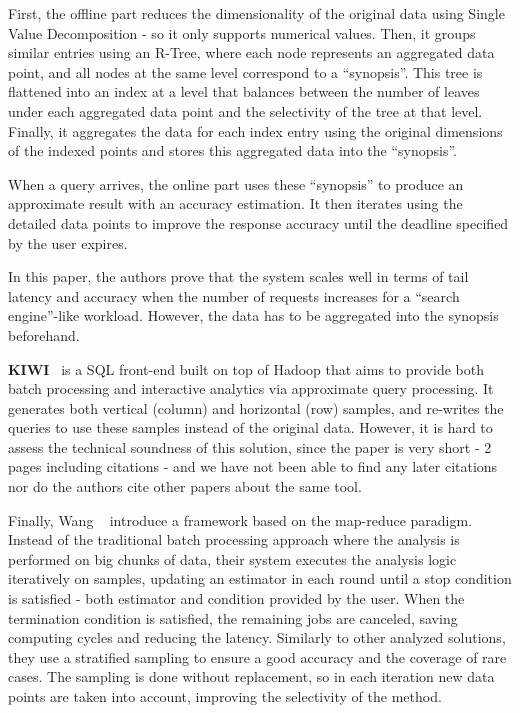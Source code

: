 First, the offline part reduces the dimensionality of the original data using 
Single Value Decomposition - so it only supports numerical values. 
Then, it groups similar entries using an R-Tree, where each node represents an 
aggregated data point, and all nodes at the same level correspond to a 
``synopsis''. This tree is flattened into an index at a level that balances 
between the number of leaves under each aggregated data point and the 
selectivity of the tree at that level. Finally, it aggregates the data for 
each index entry using the original dimensions of the indexed points and stores 
this aggregated data into the ``synopsis''.

When a query arrives, the online part uses these ``synopsis'' to produce 
an approximate result with an accuracy estimation. It then iterates 
using the detailed data points to improve the response accuracy until the
deadline specified by the user expires.

In this paper, the authors prove that the system scales well in terms 
of tail latency and accuracy when the number of requests increases for a 
``search engine''-like workload. However, the data has to be aggregated into 
the synopsis beforehand.

\medskip

\textbf{KIWI}~\cite{Kim2015} is a SQL front-end built on top of Hadoop that aims 
to provide both batch processing and interactive analytics via approximate
query processing. It generates both vertical (column) and horizontal (row) 
samples, and re-writes the queries to use these samples instead of the original 
data. However, it is hard to assess the technical soundness of this 
solution, since the paper is very short - 2 pages including citations -
and we have not been able to find any later citations nor do the authors cite 
other papers about the same tool.

\medskip

Finally, Wang \etal~\cite{WangYi2015} introduce a framework based on the 
map-reduce paradigm. Instead of the traditional batch processing approach 
where the analysis is performed on big chunks of data, their system executes the 
analysis logic iteratively on samples, updating an estimator in each round 
until a stop condition is satisfied - both estimator and condition provided by 
the user. When the termination condition is satisfied, the remaining jobs are 
canceled, saving computing cycles and reducing the latency. Similarly to other 
analyzed solutions, they use a stratified sampling to ensure a good accuracy and 
the coverage of rare cases. 
The sampling is done without replacement, so in each iteration new data points 
are taken into account, improving the selectivity of the method.


